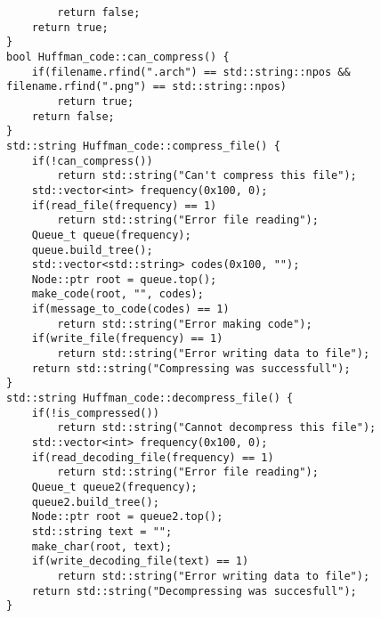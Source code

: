 \begin{verbatim}
        return false;
    return true;
}
bool Huffman_code::can_compress() {
    if(filename.rfind(".arch") == std::string::npos && filename.rfind(".png") == std::string::npos)
        return true;
    return false;
}
std::string Huffman_code::compress_file() {
    if(!can_compress())
        return std::string("Can't compress this file");
    std::vector<int> frequency(0x100, 0);
    if(read_file(frequency) == 1)
        return std::string("Error file reading");
    Queue_t queue(frequency);
    queue.build_tree();
    std::vector<std::string> codes(0x100, "");
    Node::ptr root = queue.top();
    make_code(root, "", codes);
    if(message_to_code(codes) == 1)
        return std::string("Error making code");
    if(write_file(frequency) == 1)
        return std::string("Error writing data to file");
    return std::string("Compressing was successfull");
}
std::string Huffman_code::decompress_file() {
    if(!is_compressed())
        return std::string("Cannot decompress this file");
    std::vector<int> frequency(0x100, 0);
    if(read_decoding_file(frequency) == 1)
        return std::string("Error file reading");
    Queue_t queue2(frequency);
    queue2.build_tree();
    Node::ptr root = queue2.top();
    std::string text = "";
    make_char(root, text);
    if(write_decoding_file(text) == 1)
        return std::string("Error writing data to file");
    return std::string("Decompressing was succesfull");
}
\end{verbatim}
